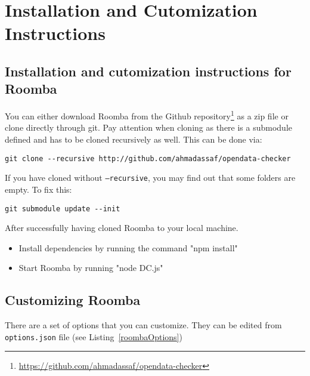 \chapter{Installation and Cutomization Instructions}
\label{appendix:appendixD}

\section{Installation and cutomization instructions for Roomba}
\label{section:installation_roomba}

You can either download Roomba from the Github repository\footnote{\url{https://github.com/ahmadassaf/opendata-checker}} as a zip file or clone directly through git. Pay attention when cloning as there is a submodule defined and has to be cloned recursively as well. This can be done via:

\begin{verbatim}
git clone --recursive http://github.com/ahmadassaf/opendata-checker
\end{verbatim}

If you have cloned without \texttt{--recursive}, you may find out that some folders are empty. To fix this:
\begin{verbatim}
git submodule update --init
\end{verbatim}

After successfully having cloned Roomba to your local machine.
\begin{itemize}
	\item Install dependencies by running the command "npm install"
	\item Start Roomba by running "node DC.js"
\end{itemize}

\section{Customizing Roomba}

There are a set of options that you can customize. They can be edited from \texttt{options.json} file (see Listing~\ref{roombaOptions})



